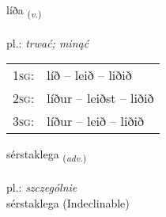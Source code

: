 \documentclass[frontgrid, backgrid]{flacards}\usepackage[]{graphicx}\usepackage[]{xcolor}
\begin{document}
\renewcommand{\blhead}{\vskip5pt {\small\bfseries\footnotesize Sagnorð | czasownik }}
\renewcommand{\bcfoot}{\vskip5pt \hspace{2pt}{\small\bfseries\footnotesize 1K}}


{líða \small{\textsubscript{(\textit{v.})}} \\[1ex] %
\textphonetic{[liːða]} \\
pl.: \emph{trwać; minąć} \\  [2ex]
\renewcommand*{\arraystretch}{0.8}
\begin{tabular}{p{1cm}l}
\textsc{1sg}: & líð -- leið -- liðið \\ 
\textsc{2sg}: & líður -- leiðst -- liðið \\ 
\textsc{3sg}: & líður -- leið -- liðið \\ 
\end{tabular}
}


\renewcommand{\flhead}{\vskip5pt \fboxsep=0pt {\small\bfseries\footnotesize Atviksorð | przysłówek}}
\renewcommand{\fcfoot}{\vskip5pt \fboxsep=0pt \hspace{2pt}{\small\bfseries\footnotesize 1K}}

\renewcommand{\blhead}{\vskip5pt {\small\bfseries\footnotesize Atviksorð | przysłówek }}
\renewcommand{\bcfoot}{\vskip5pt \hspace{2pt}{\small\bfseries\footnotesize 1K}}


{sérstaklega \small{\textsubscript{(\textit{adv.})}} \\[1ex]
 \\
pl.: \emph{szczególnie} \\  [2ex]
sérstaklega (Indeclinable)}

\renewcommand{\flhead}{\vskip5pt \fboxsep=0pt {\small\bfseries\footnotesize Sagnorð | czasownik}}
\renewcommand{\fcfoot}{\vskip5pt \fboxsep=0pt \hspace{2pt}{\small\bfseries\footnotesize 1K}}
\end{document}
